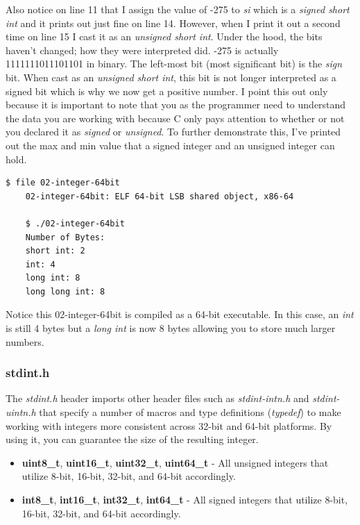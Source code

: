 \documentclass[../main.tex]{subfiles}
\begin{document}
	Also notice on line 11 that I assign the value of -275 to \textit{si} which is a \textit{signed short int} and it prints out just fine on line 14.  However, when I print it out a second time on line 15 I cast it as an \textit{unsigned short int}.  Under the hood, the bits haven't changed; how they were interpreted did.  -275 is actually 1111111011101101 in binary.  The left-most bit (most significant bit) is the \textit{sign} bit.  When cast as an \textit{unsigned short int}, this bit is not longer interpreted as a signed bit which is why we now get a positive number.  I point this out only because it is important to note that you as the programmer need to understand the data you are working with because C only pays attention to whether or not you declared it as \textit{signed} or \textit{unsigned}.  To further demonstrate this, I've printed out the max and min value that a signed integer and an unsigned integer can hold.\\
	
	
	
	\begin{lstlisting}[language=bash, numbers=none]
	$ file 02-integer-64bit
	02-integer-64bit: ELF 64-bit LSB shared object, x86-64
	
	$ ./02-integer-64bit 
	Number of Bytes:
	short int: 2
	int: 4
	long int: 8
	long long int: 8
	\end{lstlisting}
	
	Notice this 02-integer-64bit is compiled as a 64-bit executable.  In this case, an \textit{int} is still 4 bytes but a \textit{long int} is now 8 bytes allowing you to store much larger numbers.  
	
	\subsubsection{stdint.h}
	
	The \textit{stdint.h} header imports other header files such as \textit{stdint-intn.h} and \textit{stdint-uintn.h} that specify a number of macros and type definitions (\textit{typedef}) to make working with integers more consistent across 32-bit and 64-bit platforms.  By using it, you can guarantee the size of the resulting integer. 
	\begin{itemize}
		\item \textbf{uint8\_t}, \textbf{uint16\_t}, \textbf{uint32\_t}, \textbf{uint64\_t} - All unsigned integers that utilize 8-bit, 16-bit, 32-bit, and 64-bit accordingly.
		\item \textbf{int8\_t}, \textbf{int16\_t}, \textbf{int32\_t}, \textbf{int64\_t} - All signed integers that utilize 8-bit, 16-bit, 32-bit, and 64-bit accordingly.
	\end{itemize}
\end{document}
